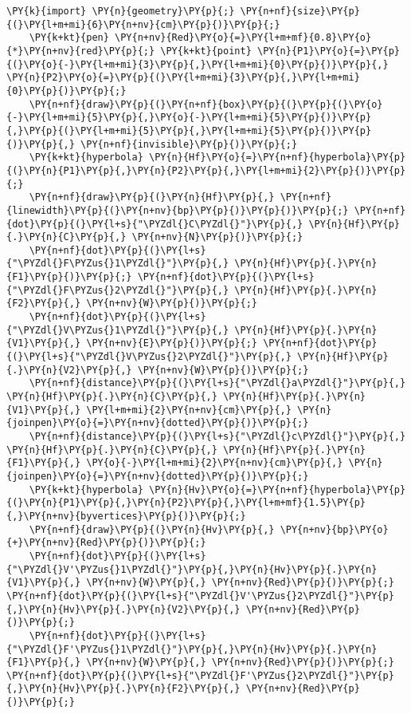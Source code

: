 \begin{Verbatim}[commandchars=\\\{\}]
    \PY{k}{import} \PY{n}{geometry}\PY{p}{;} \PY{n+nf}{size}\PY{p}{(}\PY{l+m+mi}{6}\PY{n+nv}{cm}\PY{p}{)}\PY{p}{;}
    \PY{k+kt}{pen} \PY{n+nv}{Red}\PY{o}{=}\PY{l+m+mf}{0.8}\PY{o}{*}\PY{n+nv}{red}\PY{p}{;} \PY{k+kt}{point} \PY{n}{P1}\PY{o}{=}\PY{p}{(}\PY{o}{-}\PY{l+m+mi}{3}\PY{p}{,}\PY{l+m+mi}{0}\PY{p}{)}\PY{p}{,} \PY{n}{P2}\PY{o}{=}\PY{p}{(}\PY{l+m+mi}{3}\PY{p}{,}\PY{l+m+mi}{0}\PY{p}{)}\PY{p}{;}
    \PY{n+nf}{draw}\PY{p}{(}\PY{n+nf}{box}\PY{p}{(}\PY{p}{(}\PY{o}{-}\PY{l+m+mi}{5}\PY{p}{,}\PY{o}{-}\PY{l+m+mi}{5}\PY{p}{)}\PY{p}{,}\PY{p}{(}\PY{l+m+mi}{5}\PY{p}{,}\PY{l+m+mi}{5}\PY{p}{)}\PY{p}{)}\PY{p}{,} \PY{n+nf}{invisible}\PY{p}{)}\PY{p}{;}
    \PY{k+kt}{hyperbola} \PY{n}{Hf}\PY{o}{=}\PY{n+nf}{hyperbola}\PY{p}{(}\PY{n}{P1}\PY{p}{,}\PY{n}{P2}\PY{p}{,}\PY{l+m+mi}{2}\PY{p}{)}\PY{p}{;}
    \PY{n+nf}{draw}\PY{p}{(}\PY{n}{Hf}\PY{p}{,} \PY{n+nf}{linewidth}\PY{p}{(}\PY{n+nv}{bp}\PY{p}{)}\PY{p}{)}\PY{p}{;} \PY{n+nf}{dot}\PY{p}{(}\PY{l+s}{"\PYZdl{}C\PYZdl{}"}\PY{p}{,} \PY{n}{Hf}\PY{p}{.}\PY{n}{C}\PY{p}{,} \PY{n+nv}{N}\PY{p}{)}\PY{p}{;}
    \PY{n+nf}{dot}\PY{p}{(}\PY{l+s}{"\PYZdl{}F\PYZus{}1\PYZdl{}"}\PY{p}{,} \PY{n}{Hf}\PY{p}{.}\PY{n}{F1}\PY{p}{)}\PY{p}{;} \PY{n+nf}{dot}\PY{p}{(}\PY{l+s}{"\PYZdl{}F\PYZus{}2\PYZdl{}"}\PY{p}{,} \PY{n}{Hf}\PY{p}{.}\PY{n}{F2}\PY{p}{,} \PY{n+nv}{W}\PY{p}{)}\PY{p}{;}
    \PY{n+nf}{dot}\PY{p}{(}\PY{l+s}{"\PYZdl{}V\PYZus{}1\PYZdl{}"}\PY{p}{,} \PY{n}{Hf}\PY{p}{.}\PY{n}{V1}\PY{p}{,} \PY{n+nv}{E}\PY{p}{)}\PY{p}{;} \PY{n+nf}{dot}\PY{p}{(}\PY{l+s}{"\PYZdl{}V\PYZus{}2\PYZdl{}"}\PY{p}{,} \PY{n}{Hf}\PY{p}{.}\PY{n}{V2}\PY{p}{,} \PY{n+nv}{W}\PY{p}{)}\PY{p}{;}
    \PY{n+nf}{distance}\PY{p}{(}\PY{l+s}{"\PYZdl{}a\PYZdl{}"}\PY{p}{,} \PY{n}{Hf}\PY{p}{.}\PY{n}{C}\PY{p}{,} \PY{n}{Hf}\PY{p}{.}\PY{n}{V1}\PY{p}{,} \PY{l+m+mi}{2}\PY{n+nv}{cm}\PY{p}{,} \PY{n}{joinpen}\PY{o}{=}\PY{n+nv}{dotted}\PY{p}{)}\PY{p}{;}
    \PY{n+nf}{distance}\PY{p}{(}\PY{l+s}{"\PYZdl{}c\PYZdl{}"}\PY{p}{,} \PY{n}{Hf}\PY{p}{.}\PY{n}{C}\PY{p}{,} \PY{n}{Hf}\PY{p}{.}\PY{n}{F1}\PY{p}{,} \PY{o}{-}\PY{l+m+mi}{2}\PY{n+nv}{cm}\PY{p}{,} \PY{n}{joinpen}\PY{o}{=}\PY{n+nv}{dotted}\PY{p}{)}\PY{p}{;}
    \PY{k+kt}{hyperbola} \PY{n}{Hv}\PY{o}{=}\PY{n+nf}{hyperbola}\PY{p}{(}\PY{n}{P1}\PY{p}{,}\PY{n}{P2}\PY{p}{,}\PY{l+m+mf}{1.5}\PY{p}{,}\PY{n+nv}{byvertices}\PY{p}{)}\PY{p}{;}
    \PY{n+nf}{draw}\PY{p}{(}\PY{n}{Hv}\PY{p}{,} \PY{n+nv}{bp}\PY{o}{+}\PY{n+nv}{Red}\PY{p}{)}\PY{p}{;}
    \PY{n+nf}{dot}\PY{p}{(}\PY{l+s}{"\PYZdl{}V'\PYZus{}1\PYZdl{}"}\PY{p}{,}\PY{n}{Hv}\PY{p}{.}\PY{n}{V1}\PY{p}{,} \PY{n+nv}{W}\PY{p}{,} \PY{n+nv}{Red}\PY{p}{)}\PY{p}{;} \PY{n+nf}{dot}\PY{p}{(}\PY{l+s}{"\PYZdl{}V'\PYZus{}2\PYZdl{}"}\PY{p}{,}\PY{n}{Hv}\PY{p}{.}\PY{n}{V2}\PY{p}{,} \PY{n+nv}{Red}\PY{p}{)}\PY{p}{;}
    \PY{n+nf}{dot}\PY{p}{(}\PY{l+s}{"\PYZdl{}F'\PYZus{}1\PYZdl{}"}\PY{p}{,}\PY{n}{Hv}\PY{p}{.}\PY{n}{F1}\PY{p}{,} \PY{n+nv}{W}\PY{p}{,} \PY{n+nv}{Red}\PY{p}{)}\PY{p}{;} \PY{n+nf}{dot}\PY{p}{(}\PY{l+s}{"\PYZdl{}F'\PYZus{}2\PYZdl{}"}\PY{p}{,}\PY{n}{Hv}\PY{p}{.}\PY{n}{F2}\PY{p}{,} \PY{n+nv}{Red}\PY{p}{)}\PY{p}{;}
\end{Verbatim}

